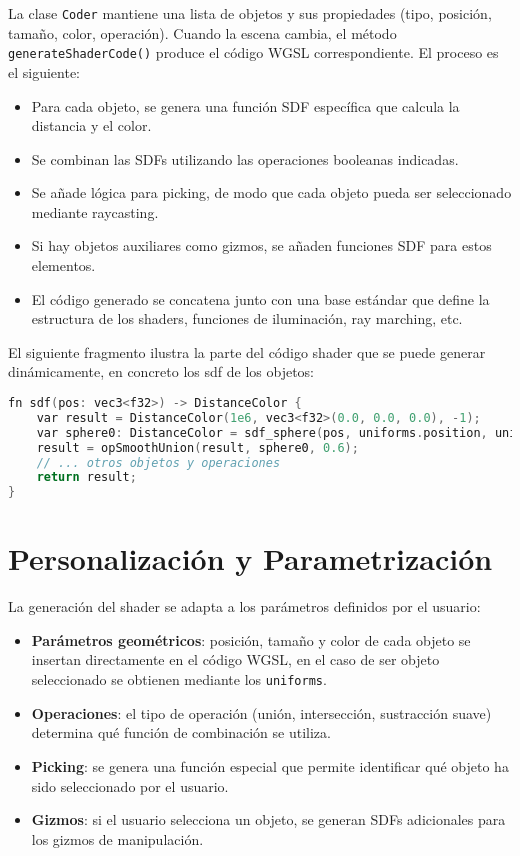 La clase \texttt{Coder} mantiene una lista de objetos y sus propiedades (tipo,
posición, tamaño, color, operación). Cuando la escena cambia, el método
\texttt{generateShaderCode()} produce el código WGSL correspondiente. El
proceso es el siguiente:

\begin{itemize}
    \item Para cada objeto, se genera una función SDF específica que calcula la distancia
          y el color.
    \item Se combinan las SDFs utilizando las operaciones booleanas indicadas.
    \item Se añade lógica para picking, de modo que cada objeto pueda ser seleccionado
          mediante raycasting.
    \item Si hay objetos auxiliares como gizmos, se añaden funciones SDF para estos
          elementos.
    \item El código generado se concatena junto con una base estándar que define la
          estructura de los shaders, funciones de iluminación, ray marching, etc.
\end{itemize}

El siguiente fragmento ilustra la parte del código shader que se puede generar
dinámicamente, en concreto los sdf de los objetos:

\begin{lstlisting}[language=C++, caption={Fragmento de código WGSL generado}]
fn sdf(pos: vec3<f32>) -> DistanceColor {
    var result = DistanceColor(1e6, vec3<f32>(0.0, 0.0, 0.0), -1);
    var sphere0: DistanceColor = sdf_sphere(pos, uniforms.position, uniforms.size[0], uniforms.color, 0);
    result = opSmoothUnion(result, sphere0, 0.6);
    // ... otros objetos y operaciones
    return result;
}
\end{lstlisting}

\section{Personalización y Parametrización}

La generación del shader se adapta a los parámetros definidos por el usuario:

\begin{itemize}
    \item \textbf{Parámetros geométricos}: posición, tamaño y color de cada objeto se insertan directamente en el código WGSL, en el caso de ser objeto seleccionado se obtienen mediante los \texttt{uniforms}.
    \item \textbf{Operaciones}: el tipo de operación (unión, intersección, sustracción suave) determina qué función de combinación se utiliza.
    \item \textbf{Picking}: se genera una función especial que permite identificar qué objeto ha sido seleccionado por el usuario.
    \item \textbf{Gizmos}: si el usuario selecciona un objeto, se generan SDFs adicionales para los gizmos de manipulación.
\end{itemize}

